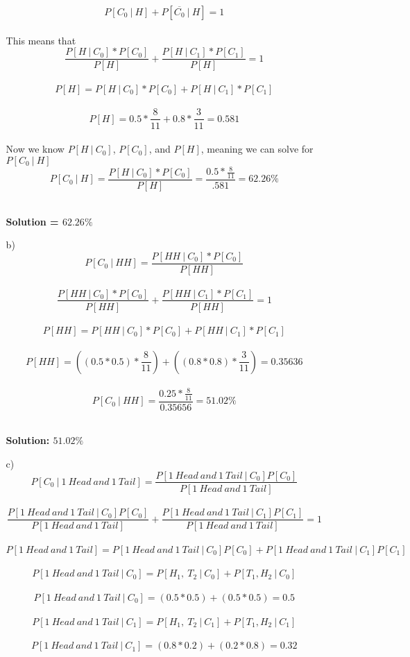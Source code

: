 \documentclass[11pt]{article}
\begin{document}
\begin{enumerate}
\begin{itemize}
$$ P[C_0\ |\ H] + P[\overline{C_0}\ |\ H] = 1$$
\\
This means that
$$\frac{P[H\ |\ C_0] * P[C_0]}{P[H]} + \frac{P[H\ |\ C_1] * P[C_1]}{P[H]} = 1$$
\\
$$P[H] = P[H\ |\ C_0] * P[C_0] + P[H\ |\ C_1] * P[C_1]$$
\\
$$P[H] = 0.5* \frac{8}{11} + 0.8 * \frac{3}{11} = 0.581$$
\\
Now we know $P[H\ |\ C_0]$, $P[C_0]$, and $P[H]$, meaning we can solve for $P[C_0\ |\ H]$
\\
$$ P[C_0\ |\ H] = \frac{P[H\ |\ C_0] * P[C_0]}{P[H]} = \frac{0.5 * \frac{8}{11}}{.581} = 62.26\%$$\\
\begin{center}
\textbf{Solution = $62.26\%$}
\end{center}
\newpage	
\item[b) ] 
$$ P[C_0\ |\ HH] = \frac{P[HH\ |\ C_0] * P[C_0]}{P[HH]} $$
\\
$$\frac{P[HH\ |\ C_0] * P[C_0]}{P[HH]} + \frac{P[HH\ |\ C_1] * P[C_1]}{P[HH]} = 1$$
\\
$$P[HH] = P[HH\ |\ C_0] * P[C_0] + P[HH\ |\ C_1] * P[C_1]$$
\\
$$P[HH] = ((0.5 * 0.5) * \frac{8}{11}) + ((0.8 * 0.8) * \frac{3}{11}) = 0.35636$$
\\
$$ P[C_0\ |\ HH] = \frac{0.25 * \frac{8}{11}}{0.35656} = 51.02\% $$
\\
\begin{center}
\textbf{Solution: $51.02\%$}
\end{center}
\newpage
\item[c) ] $$ P[C_0\ |\ 1\ Head\ and\ 1\ Tail] = \frac{P[1\ Head\ and\ 1\ Tail\ |\ C_0]P[C_0]}{P[1\ Head\ and\ 1\ Tail]}$$
\\
$$ \frac{P[1\ Head\ and\ 1\ Tail\ |\ C_0]P[C_0]}{P[1\ Head\ and\ 1\ Tail]} +  \frac{P[1\ Head\ and\ 1\ Tail\ |\ C_1]P[C_1]}{P[1\ Head\ and\ 1\ Tail]} = 1$$
\\
$$P[1\ Head\ and\ 1\ Tail] = P[1\ Head\ and\ 1\ Tail\ |\ C_0]P[C_0] + P[1\ Head\ and\ 1\ Tail\ |\ C_1]P[C_1]$$
\\
$$P[1\ Head\ and\ 1\ Tail\ |\ C_0] = P[H_1,\ T_2\ |\ C_0] + P[T_1, H_2\ |\ C_0]$$
\\
$$P[1\ Head\ and\ 1\ Tail\ |\ C_0] = (0.5 * 0.5) + (0.5 * 0.5) = 0.5$$
\\
$$P[1\ Head\ and\ 1\ Tail\ |\ C_1] = P[H_1,\ T_2\ |\ C_1] + P[T_1, H_2\ |\ C_1]$$
\\
$$P[1\ Head\ and\ 1\ Tail\ |\ C_1] = (0.8 * 0.2) + (0.2 * 0.8) = 0.32$$

\end{itemize}
\end{enumerate}
\end{document}
